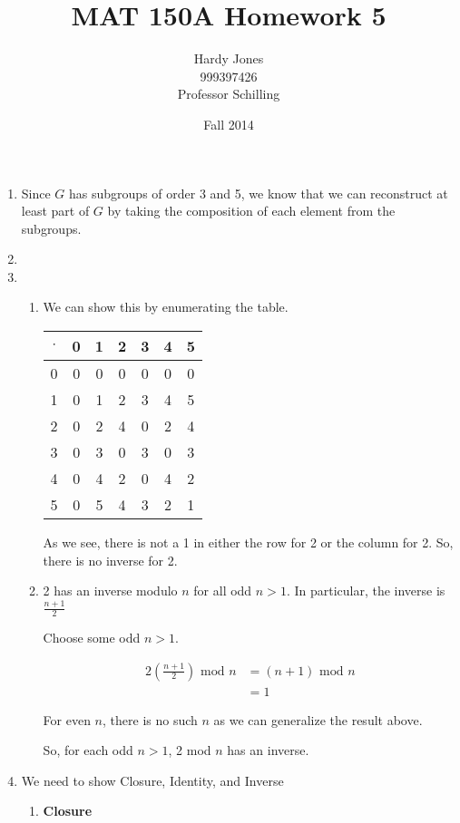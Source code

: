 \documentclass[12pt,letterpaper]{article}
\title{MAT 150A Homework 5\vspace{-2ex}}
\author{Hardy Jones\\
        999397426\\
        Professor Schilling\vspace{-2ex}}
\date{Fall 2014}
\begin{document}
  \maketitle

  \begin{enumerate}
    \item
      Since $G$ has subgroups of order 3 and 5, we know that we can reconstruct at least part of $G$ by taking the composition of each element from the subgroups.

    \item
    \item
      \begin{enumerate}
        \item We can show this by enumerating the table.

          \begin{tabular}{c | c | c | c | c | c | c |}
            $\cdot$ & 0 & 1 & 2 & 3 & 4 & 5 \\
            \hline
            0 & 0 & 0 & 0 & 0 & 0 & 0 \\
            \hline
            1 & 0 & 1 & 2 & 3 & 4 & 5 \\
            \hline
            2 & 0 & 2 & 4 & 0 & 2 & 4 \\
            \hline
            3 & 0 & 3 & 0 & 3 & 0 & 3 \\
            \hline
            4 & 0 & 4 & 2 & 0 & 4 & 2 \\
            \hline
            5 & 0 & 5 & 4 & 3 & 2 & 1 \\
            \hline
          \end{tabular}

          As we see, there is not a 1 in either the row for 2 or the column for 2.
          So, there is no inverse for 2.
        \item
          2 has an inverse modulo $n$ for all odd $n > 1$. In particular, the inverse is $\frac{n + 1}{2}$

          Choose some odd $n > 1$.

          \begin{align*}
            2\left(\frac{n + 1}{2}\right) \text{ mod } n &= (n + 1) \text{ mod } n \\
            &= 1
          \end{align*}

          For even $n$, there is no such $n$ as we can generalize the result above.

          So, for each odd $n > 1$, 2 mod $n$ has an inverse.
      \end{enumerate}
    \item
      We need to show Closure, Identity, and Inverse
      \begin{enumerate}
        \item \textbf{Closure}


\end{enumerate}
\end{enumerate}
\end{document}
